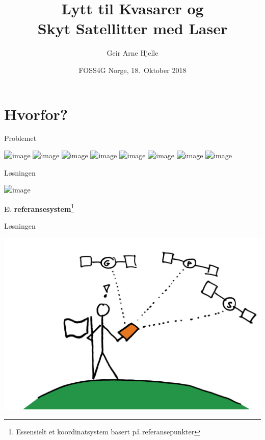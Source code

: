 \documentclass[12pt,table,t]{beamer}
\title{Lytt til Kvasarer og\\Skyt Satellitter med Laser}
\author{Geir Arne Hjelle}
\date{FOSS4G Norge, 18.\ Oktober 2018}
\begin{document}
\frame[plain]{\titlepage}

\part{Hvorfor?}

\begin{frame}[c]{Problemet}
  \begin{center}
    \includegraphics<1>[width=\textwidth]{figure/altimetry_01}
    \includegraphics<2>[width=\textwidth]{figure/altimetry_02}
    \includegraphics<3>[width=\textwidth]{figure/altimetry_03}
    \includegraphics<4>[width=\textwidth]{figure/altimetry_04}
    \includegraphics<5>[width=\textwidth]{figure/altimetry_05}
    \includegraphics<6>[width=\textwidth]{figure/gps_01}
    \includegraphics<7>[width=\textwidth]{figure/gps_02}
    \includegraphics<8>[width=\textwidth]{figure/gps_03}
  \end{center}
\end{frame}


\begin{frame}[c]{Løsningen}
  \begin{center}
    \includegraphics<1>[width=\textwidth]{figure/reference_system}
  \end{center}

  Et \textbf{referansesystem}\footnote{Essensielt et koordinatsystem basert på referansepunkter}
\end{frame}


\begin{frame}[c]{Løsningen}
  \begin{center}
    \includegraphics[width=\textwidth]{figure/gps_04}
  \end{center}
\end{frame}
\end{document}
